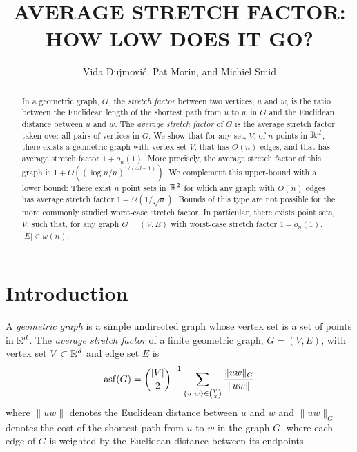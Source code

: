 \documentclass{patmorin}
\title{\MakeUppercase{Average Stretch Factor: How Low Does It Go?}}
\author{Vida Dujmovi\'c, Pat Morin, and Michiel Smid}
\DeclareMathOperator{\asf}{asf}
\begin{document}
\begin{titlepage}
\maketitle

\begin{abstract}
  In a geometric graph, $G$, the \emph{stretch factor} between two
  vertices, $u$ and $w$, is the ratio between the Euclidean length of
  the shortest path from $u$ to $w$ in $G$ and the Euclidean distance
  between $u$ and $w$.  The \emph{average stretch factor} of $G$ is
  the average stretch factor taken over all pairs of vertices in $G$.
  We show that for any set, $V$, of $n$ points in $\mathbb{R}^d$, there exists
  a geometric graph with vertex set $V$, that has $O(n)$ edges, and
  that has average stretch factor $1+ o_n(1)$.  More precisely, the
  average stretch factor of this graph is $1+O((\log n/n)^{1/(4d-1)})$.
  We complement this upper-bound with a lower bound: There exist $n$
  point sets in $\mathbb{R}^2$ for which any graph with $O(n)$ edges has average
  stretch factor $1+\Omega(1/\sqrt{n})$.  Bounds of this type are not
  possible for the more commonly studied worst-case stretch factor.
  In particular, there exists point sets, $V$, such that, for any graph
  $G=(V,E)$ with worst-case stretch factor $1+o_n(1)$, $|E|\in\omega(n)$.
\end{abstract}

\end{titlepage}

\tableofcontents

\newpage

\section{Introduction}

A \emph{geometric graph} is a simple undirected graph whose vertex
set is a set of points in $\mathbb{R}^d$.  The \emph{average stretch factor}
of a finite geometric graph, $G=(V,E)$, with vertex set $V\subset \mathbb{R}^d$
and edge set $E$ is
\begin{equation}
    \asf(G) = \binom{|V|}{2}^{-1}\sum_{\{u,w\}\in\binom{V}{2}}\frac{\|uw\|_G}{\|uw\|} \eqlabel{asf}
\end{equation}
where $\|uw\|$ denotes the Euclidean distance between $u$ and $w$
and $\|uw\|_G$ denotes the cost of the shortest path from $u$ to $w$
in the graph $G$, where each edge of $G$ is weighted by the Euclidean
distance between its endpoints.
\end{document}
